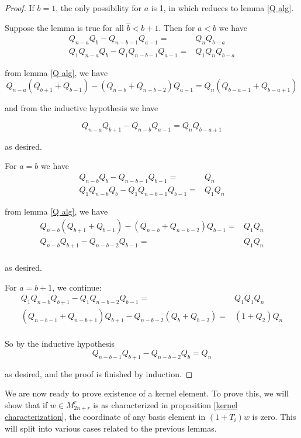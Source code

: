 \documentclass{amsart}
\begin{document}
 \begin{proof}
 	If $b=1$, the only possibility for $a$ is 1, in which reduces to lemma \ref{Q alg}.
 	
 	Suppose the lemma is true for all $\widehat{b}<b+1$. Then for $a< b$ we have 
 	\begin{align*}	
 		Q_{n-a}Q_b -Q_{n-b-1}Q_{a-1}=&Q_{n}Q_{b-a}\\
 		Q_1Q_{n-a}Q_b-Q_1Q_{n-b-1}Q_{a-1}=&Q_1Q_{n}Q_{b-a}
 	\end{align*}
 	
 	from lemma \ref{Q alg}, we have	
 	$$Q_{n-a}(Q_{b+1}+Q_{b-1})-(Q_{n-b}+Q_{n-b-2})Q_{a-1}=Q_{n}(Q_{b-a-1}+Q_{b-a+1})$$
 	
 	and from the inductive hypothesis we have
 	
 	$$Q_{n-a}Q_{b+1}-Q_{n-b}Q_{a-1}=Q_{n}Q_{b-a+1}$$
 	
 	as desired.
 	
 	For $a=b$ we have 
 	\begin{align*}
 		Q_{n-b}Q_b -Q_{n-b-1}Q_{b-1}=&Q_{n}\\
 		Q_1Q_{n-b}Q_b-Q_1Q_{n-b-1}Q_{b-1}=&Q_1Q_{n}
 	\end{align*}
 	
 	from lemma \ref{Q alg}, we have
 	\begin{align*}
 		Q_{n-b}(Q_{b+1}+Q_{b-1})-(Q_{n-b}+Q_{n-b-2})Q_{b-1}=&Q_1Q_{n}\\
 		Q_{n-b}Q_{b+1}-Q_{n-b-2}Q_{b-1}=&Q_1Q_{n}\\
 	\end{align*}
 	
 	as desired.
 	
 	For $a=b+1$, we continue:
 	\begin{align*}
 		Q_1Q_{n-b}Q_{b+1}-Q_1Q_{n-b-2}Q_{b-1}=&Q_1Q_1Q_{n}\\
 		(Q_{n-b-1}+Q_{n-b+1})Q_{b+1}-Q_{n-b-2}(Q_{b}+Q_{b-2})=&(1+Q_2)Q_{n}\\
 	\end{align*}
 	
 	So by the inductive hypothesis
 	$$Q_{n-b-1}Q_{b+1}-Q_{n-b-2}Q_{b}=Q_{n}$$
 	
 	as desired, and the proof is finished by induction.
 	
 \end{proof}
 
 \vspace{5mm}
 We are now ready to prove existence of a kernel element. To prove this, we will show that if $w\in M_{2n+r}^r$ is as characterized in proposition \ref{kernel characterization}, the coordinate of any basis element in $(1+T_i)w$ is zero. This will split into various cases related to the previous lemmas.
 
\end{document}

